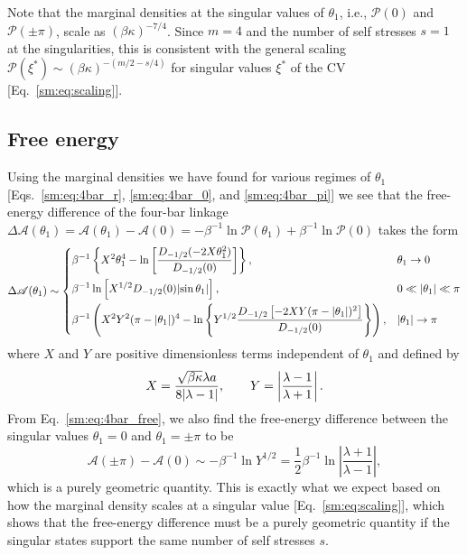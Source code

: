 Note that the marginal densities at the singular values of $\theta_{1}$, i.e., $\mathscr{P}(0)$ and $\mathscr{P}(\pm\pi)$, scale as $(\beta\kappa)^{-7/4}$.
Since $m = 4$ and the number of self stresses $s = 1$ at the singularities, this is consistent with the general scaling $\mathscr{P}(\xi^{*}) \sim (\beta\kappa)^{-(m/2 - s/4)}$ for singular values $\xi^{*}$ of the CV [Eq.~\eqref{sm:eq:scaling}].

\subsection{Free energy}

Using the marginal densities we have found for various regimes of $\theta_{1}$ [Eqs.~\eqref{sm:eq:4bar_r}, \eqref{sm:eq:4bar_0}, and \eqref{sm:eq:4bar_pi}] we see that the free-energy difference of the four-bar linkage $\Delta\mathscr{A}(\theta_1) = \mathscr{A}(\theta_1) - \mathscr{A}(0) = -\beta^{-1}\ln{\mathscr{P}(\theta_1)} + \beta^{-1}\ln{\mathscr{P}(0)}$ takes the form
%
\begin{equation}
  \Delta\mathscr{A}(\theta_1) \sim
\begin{dcases}
  \beta^{-1}\left\{X^2\theta_1^4 - \ln\left[\dfrac{D_{-1/2}(-2X\theta_1^2)}{D_{-1/2}(0)}\right]\right\}, & \theta_1 \to 0\\
  \beta^{-1}\ln\left[X^{1/2}D_{-1/2}(0)\lvert\sin{\theta_1}\rvert\right], & 0 \ll \lvert\theta_1\rvert \ll \pi\\
  \beta^{-1}\left(X^2Y^2(\pi - \lvert\theta_1\rvert)^4 - \ln\left\{Y^{1/2}\dfrac{D_{-1/2}\left[-2XY(\pi - \lvert\theta_1\rvert)^2\right]}{D_{-1/2}(0)}\right\}\right), & \lvert\theta_1\rvert \to \pi
\end{dcases}
  \label{sm:eq:4bar_free}
\end{equation}
%
where $X$ and $Y$ are positive dimensionless terms independent of $\theta_1$ and defined by
%
\begin{equation}
  X = \frac{\sqrt{\beta\kappa}\lambda a}{8\lvert\lambda-1\rvert},\qquad
  Y = \left|\frac{\lambda-1}{\lambda+1}\right|.
\end{equation}
%
From Eq.~\eqref{sm:eq:4bar_free}, we also find the free-energy difference between the singular values $\theta_{1} = 0$ and $\theta_{1} = \pm\pi$ to be
%
\begin{equation}
  \mathscr{A}(\pm\pi) - \mathscr{A}(0) \sim -\beta^{-1}\ln{Y^{1/2}} = \frac{1}{2}\beta^{-1}\ln\left|\frac{\lambda + 1}{\lambda - 1}\right|,
\end{equation}
%
which is a purely geometric quantity.
This is exactly what we expect based on how the marginal density scales at a singular value [Eq.~\eqref{sm:eq:scaling}], which shows that the free-energy difference must be a purely geometric quantity if the singular states support the same number of self stresses $s$.

